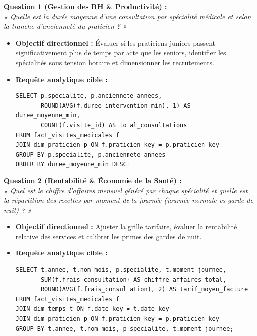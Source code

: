 \documentclass[11pt, a4paper]{article}
\begin{document}
\noindent\textbf{Question 1 (Gestion des RH \& Productivité) :} \\
\textit{« Quelle est la durée moyenne d'une consultation par spécialité médicale et selon la tranche d'ancienneté du praticien ? »}
\begin{itemize}[label=$\rightarrow$]
    \item \textbf{Objectif directionnel :} Évaluer si les praticiens juniors passent significativement plus de temps par acte que les seniors, identifier les spécialités sous tension horaire et dimensionner les recrutements.
    \item \textbf{Requête analytique cible :}
    \begin{lstlisting}
SELECT p.specialite, p.anciennete_annees,
       ROUND(AVG(f.duree_intervention_min), 1) AS duree_moyenne_min,
       COUNT(f.visite_id) AS total_consultations
FROM fact_visites_medicales f
JOIN dim_praticien p ON f.praticien_key = p.praticien_key
GROUP BY p.specialite, p.anciennete_annees
ORDER BY duree_moyenne_min DESC;
    \end{lstlisting}
\end{itemize}

\vspace{0.2cm}
\noindent\textbf{Question 2 (Rentabilité \& Économie de la Santé) :} \\
\textit{« Quel est le chiffre d'affaires mensuel généré par chaque spécialité et quelle est la répartition des recettes par moment de la journée (journée normale vs garde de nuit) ? »}
\begin{itemize}[label=$\rightarrow$]
    \item \textbf{Objectif directionnel :} Ajuster la grille tarifaire, évaluer la rentabilité relative des services et calibrer les primes des gardes de nuit.
    \item \textbf{Requête analytique cible :}
    \begin{lstlisting}
SELECT t.annee, t.nom_mois, p.specialite, t.moment_journee,
       SUM(f.frais_consultation) AS chiffre_affaires_total,
       ROUND(AVG(f.frais_consultation), 2) AS tarif_moyen_facture
FROM fact_visites_medicales f
JOIN dim_temps t ON f.date_key = t.date_key
JOIN dim_praticien p ON f.praticien_key = p.praticien_key
GROUP BY t.annee, t.nom_mois, p.specialite, t.moment_journee;
    \end{lstlisting}
\end{itemize}
\end{document}
